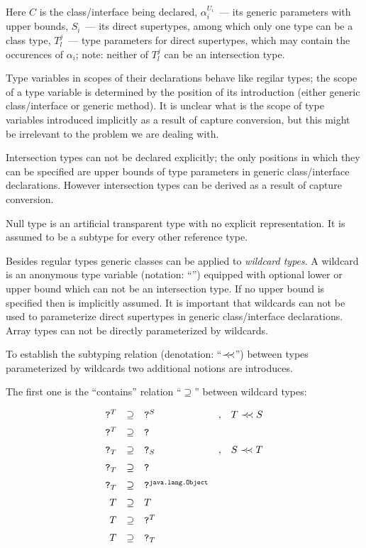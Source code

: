 Here $C$ is the class/interface being declared, $\alpha_i^{U_i}$~--- its generic parameters with upper
bounds, $S_i$~--- its direct supertypes, among which only one type can be a class type, $T^j_l$~--- type
parameters for direct supertypes, which may contain the occurences of $\alpha_i$; note: neither of $T^j_l$ can be
an intersection type.

Type variables in scopes of their declarations behave like regilar types; the scope of a type variable is
determined by the position of its introduction (either generic class/interface or generic method). It
is unclear what is the scope of type variables introduced implicitly as a result of capture
conversion, but this might be irrelevant to the problem we are dealing with.

Intersection types can not be declared explicitly; the only positions in which they can be specified are
upper bounds of type parameters in generic class/interface declarations. However intersection types can be derived
as a result of capture conversion.

Null type is an artificial transparent type with no explicit representation. It is assumed to be a subtype for
every other reference type.

Besides regular types generic classes can be applied to \emph{wildcard types}. A wildcard is an anonymous
type variable (notation: ``'') equipped with optional lower or upper bound which can not be an intersection type.
If no upper bound is specified then  is implicitly assumed. It is important that wildcards can not 
be used to parameterize direct supertypes in generic class/interface declarations. Array types can not be directly
parameterized by wildcards.

To establish the subtyping relation (denotation: ``$\prec\mathrel{\mkern-5mu}\prec$'') between types parameterized by wildcards two additional
notions are introduces.

The first one is the ``contains'' relation ``$\supseteq$'' between wildcard types:

\[
\begin{array}{rclcl}
  \texttt{?}^T&\supseteq&\texttt{?}^S&,&T\prec\mathrel{\mkern-5mu}\prec S \\[2mm]
  \texttt{?}^T&\supseteq&\texttt{?}&& \\[2mm]
  \texttt{?}_T&\supseteq&\texttt{?}_S&,&S\prec\mathrel{\mkern-5mu}\prec T\\[2mm]
  \texttt{?}_T&\supseteq&\texttt{?}&& \\[2mm]
  \texttt{?}_T&\supseteq&\texttt{?}^{\texttt{java.lang.Object}}&& \\[2mm]
  T&\supseteq& T&&\\[2mm]
  T&\supseteq&\texttt{?}^T&&\\[2mm]
  T&\supseteq&\texttt{?}_T&&
\end{array}
\]

